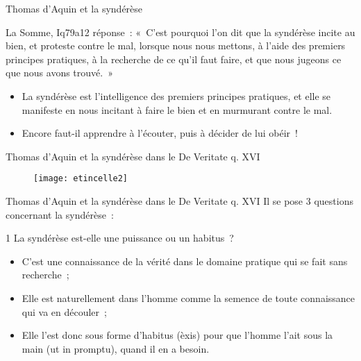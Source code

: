 \documentclass[11pt,xcolor=dvipsname,ignorenonframetext,handout]{beamer}
\begin{document}
\begin{frame}{Thomas d'Aquin et la syndérèse}
    \begin{block}{La Somme, Iq79a12 réponse~:}
        \rightskip=0pt\leftskip=0pt
        «~C'est pourquoi l'on dit que la syndérèse incite au bien, et proteste contre le mal, lorsque nous nous mettons, à l'aide des premiers principes pratiques, à la recherche de ce qu'il faut faire, et que nous jugeons ce que nous avons trouvé.~»
    \end{block}
    \begin{itemize}
        \rightskip=0pt\leftskip=0pt
        \item La syndérèse est l'intelligence des premiers principes pratiques, et elle se manifeste en nous incitant à faire le bien et en murmurant contre le mal.
        \item Encore faut-il apprendre à l'écouter, puis à décider de lui obéir~!
    \end{itemize}
\end{frame}
\begin{frame}{Thomas d'Aquin et la syndérèse dans le De Veritate q. XVI}
    {
        \begin{figure}
          \centering
          \texttt{[image: etincelle2]}
        \end{figure}
          }    
\end{frame}
\begin{frame}{Thomas d'Aquin et la syndérèse dans le De Veritate q. XVI}
    \rightskip=0pt\leftskip=0pt
    Il se pose 3 questions concernant la syndérèse~:
    \begin{block}{1 La syndérèse est-elle une puissance ou un habitus~?}
        \begin{itemize}
            \rightskip=0pt\leftskip=0pt
            \item C'est une connaissance de la vérité dans le domaine pratique qui se fait sans recherche~;
            \item Elle est naturellement dans l'homme comme la semence de toute connaissance qui va en découler~;
            \item Elle l'est donc sous forme d'habitus (èxis) pour que l'homme l'ait sous la main (ut in promptu), quand il en a besoin.
        \end{itemize}
    \end{block}
\end{frame}
\end{document}
